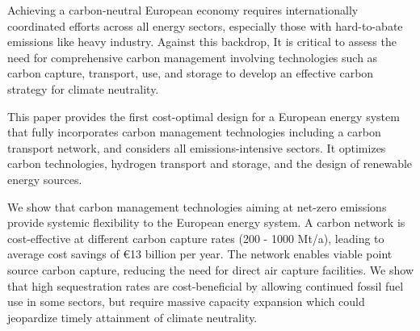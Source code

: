 Achieving a carbon-neutral European economy requires internationally coordinated efforts across all energy sectors, especially those with hard-to-abate emissions like heavy industry. Against this backdrop, It is critical to assess the need for comprehensive carbon management involving technologies such as carbon capture, transport, use, and storage to develop an effective carbon strategy for climate neutrality.

This paper provides the first cost-optimal design for a European energy system that fully incorporates carbon management technologies including a carbon transport network, and considers all emissions-intensive sectors. It optimizes carbon technologies, hydrogen transport and storage, and the design of renewable energy sources.

We show that carbon management technologies aiming at net-zero emissions provide systemic flexibility to the European energy system. A carbon network is cost-effective at different carbon capture rates (200 - 1000 Mt/a), leading to average cost savings of €13 billion per year. The \carbon{} network enables viable point source carbon capture, reducing the need for direct air capture facilities. We show that high sequestration rates are cost-beneficial by allowing continued fossil fuel use in some sectors, but require massive capacity expansion which could jeopardize timely attainment of climate neutrality.
